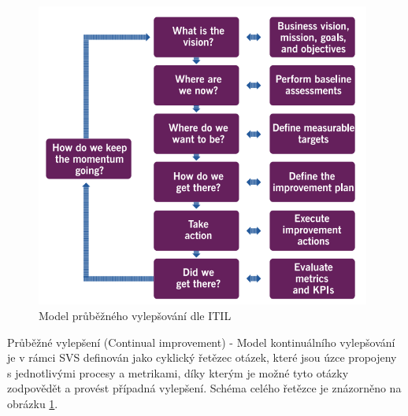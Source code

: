 \documentclass[
  digital,     %
  twoside,     %
  lof,         %
  lot,         %
]{fithesis4}
\begin{document}
\begin{compactitem}
    \begin{figure}[h]
        \begin{center}
            \includegraphics[width=11cm]{img/continual_improvement.png}
        \end{center}
        \caption{Model průběžného vylepšování dle ITIL \parencite[s.~24]{Cartlidge2020}}
        \label{fig:svs_continual_improvement}
    \end{figure} 
    \item Průběžné vylepšení (Continual improvement) - Model kontinuálního vylepšování je v rámci SVS definován jako cyklický řetězec otázek, které jsou úzce propojeny s jednotlivými procesy a metrikami, díky kterým je možné tyto otázky zodpovědět a provést případná vylepšení. Schéma celého řetězce je znázorněno na obrázku \ref{fig:svs_continual_improvement}.
\end{compactitem}
\end{document}

